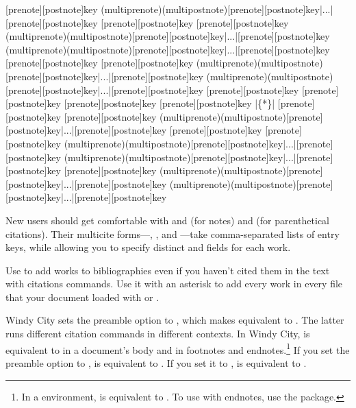 \documentclass[11pt,letterpaper,oneside]{article}
\begin{document}
\begin{ltxsyntax}
[prenote][postnote]{key}
(multiprenote)(multipostnote)[prenote][postnote]{key}|...|[prenote][postnote]{key}
[prenote][postnote]{key}
[prenote][postnote]{key}
(multiprenote)(multipostnote)[prenote][postnote]{key}|...|[prenote][postnote]{key}
(multiprenote)(multipostnote)[prenote][postnote]{key}|...|[prenote][postnote]{key}
[prenote][postnote]{key}
[prenote][postnote]{key}
(multiprenote)(multipostnote)[prenote][postnote]{key}|...|[prenote][postnote]{key}
(multiprenote)(multipostnote)[prenote][postnote]{key}|...|[prenote][postnote]{key}
[prenote][postnote]{key}
[prenote][postnote]{key}
[prenote][postnote]{key}
[prenote][postnote]{key}
|\{*\}|
[prenote][postnote]{key}
[prenote][postnote]{key}
(multiprenote)(multipostnote)[prenote][postnote]{key}|...|[prenote][postnote]{key}
[prenote][postnote]{key}
[prenote][postnote]{key}
(multiprenote)(multipostnote)[prenote][postnote]{key}|...|[prenote][postnote]{key}
(multiprenote)(multipostnote)[prenote][postnote]{key}|...|[prenote][postnote]{key}
[prenote][postnote]{key}
(multiprenote)(multipostnote)[prenote][postnote]{key}|...|[prenote][postnote]{key}
(multiprenote)(multipostnote)[prenote][postnote]{key}|...|[prenote][postnote]{key}
\end{ltxsyntax}

\noindent New users should get comfortable with  and
 (for notes) and  (for parenthetical
citations). Their multicite forms---, , and
---take comma-separated lists of entry keys, while
allowing you to specify distinct  and
 fields for each work.

Use  to add works to bibliographies even if you haven't
cited them in the text with citations commands. Use it with an
asterisk to add every work in every  file that your document
loaded with  or .

Windy City sets the  preamble option to ,
which makes  equivalent to . The latter
runs different citation commands in different contexts. In Windy City,
 is equivalent to  in a document's body
and  in footnotes and endnotes.\footnote{In a 
environment,  is equivalent to . To use
 with endnotes, use the  package.} If you
set the  preamble option to , 
is equivalent to . If you set it to ,
 is equivalent to .
\end{document}
